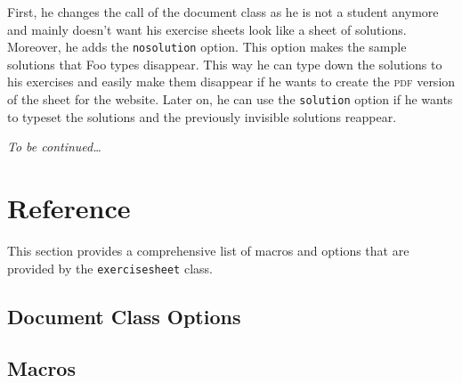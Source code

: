 \documentclass{report}
\def\exercisesheet{\texttt{exercisesheet}}
\begin{document}
First, he changes the call of the document class as he is not a
student anymore and mainly doesn't want his exercise sheets look like
a sheet of solutions. Moreover, he adds the \lstinline{nosolution}
option. This option makes the sample solutions that Foo types
disappear. This way he can type down the solutions to his exercises
and easily make them disappear if he wants to create the \textsc{pdf}
version of the sheet for the website. Later on, he can use the
\lstinline{solution} option if he wants to typeset the solutions and
the previously invisible solutions reappear.



\emph{To be continued\ldots}

\chapter{Reference}

This section provides a comprehensive list of macros and options that
are provided by the \exercisesheet{} class.

\section{Document Class Options}

\section{Macros}
\end{document}

